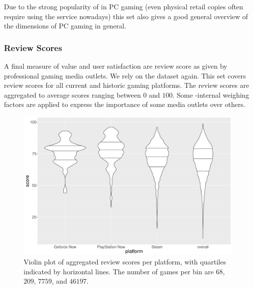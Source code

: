 Due to the strong popularity of \steam in PC gaming (even physical retail copies often require using the service nowadays) this set also gives a good general overview of the dimensions of PC gaming in general.


\subsubsection{Review Scores}


A final measure of value and user satisfaction are review score as given by professional gaming media outlets. We rely on the \metacritic dataset again. This set covers review scores for all current and historic gaming platforms. The review scores are aggregated to average scores ranging between $0$ and $100$. Some \metacritic-internal weighing factors are applied to express the importance of some media outlets over others.




\begin{figure}[!t]
	\centering
	\includegraphics[width=1.0\columnwidth]{images/scores-by-platform-violin.pdf}
	\caption{Violin plot of aggregated review scores per platform, with quartiles indicated by horizontal lines. The number of games per bin are $68$, $209$, $7759$, and $46197$.}
\label{fig:scores-by-platform}
\end{figure}

